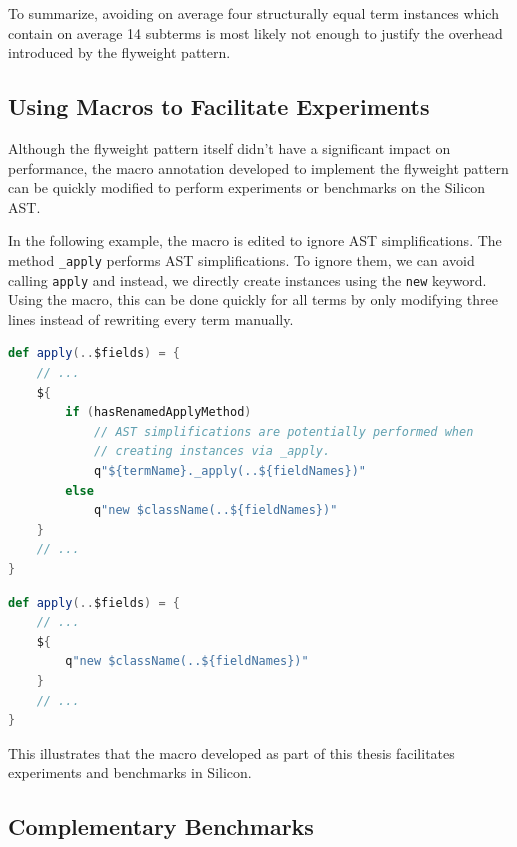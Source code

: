 \documentclass[11pt]{article}
\begin{document}
    To summarize, avoiding on average four structurally equal term instances which contain
    on average 14 subterms is most likely not enough to justify the overhead introduced by the flyweight pattern.



    \subsection{Using Macros to Facilitate Experiments}

    Although the flyweight pattern itself didn't have a significant impact on performance,
    the macro annotation developed to implement the flyweight pattern can
    be quickly modified to perform experiments or benchmarks on the Silicon AST.

    In the following example, the macro is edited to ignore AST simplifications.
    The method \texttt{\_apply} performs AST simplifications. To ignore 
    them, we can avoid calling \texttt{apply} and instead,
    we directly create instances using the \texttt{new} keyword.
    Using the macro, this can be done quickly for all terms by only modifying three lines
    instead of rewriting every term manually.

    \begin{lstlisting}[language=Scala, caption=Use AST simplifications as normal.]
def apply(..$fields) = {
    // ...
    ${
        if (hasRenamedApplyMethod)
            // AST simplifications are potentially performed when
            // creating instances via _apply.
            q"${termName}._apply(..${fieldNames})"
        else
            q"new $className(..${fieldNames})"
    }
    // ...
}  
    \end{lstlisting}

    \begin{lstlisting}[language=Scala, caption=Modified macro to ignore AST simplifications.]
def apply(..$fields) = {
    // ...
    ${
        q"new $className(..${fieldNames})"
    }
    // ...
}  
    \end{lstlisting}

    This illustrates that the macro developed as part of this thesis
    facilitates experiments and benchmarks in Silicon.

    \subsection{Complementary Benchmarks}
\end{document}
